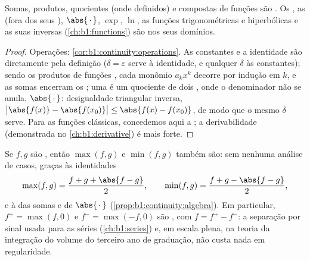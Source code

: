 \begin{proposition}\label{prop:b1:continuity:algebra}
Somas, produtos, quocientes (onde definidos) e compostas de
funções  são . Os , as 
(fora dos seus ), $\abs{\,\cdot\,}$, $\exp$, $\ln$, as
funções trigonométricas e hiperbólicas e as suas inversas
(\cref{ch:b1:functions}) são  nos seus domínios.
\end{proposition}

\begin{proof}
Operações: \cref{cor:b1:continuity:operations}. As constantes e
a identidade são  diretamente pela definição
($\delta = \varepsilon$ serve à identidade, e qualquer $\delta$ às
constantes); sendo  os produtos de funções ,
cada monômio $a_k x^k$ decorre por indução em $k$, e as somas
encerram os ; uma  é um quociente de dois
,  onde o denominador não se
anula. $\abs{\,\cdot\,}$: desigualdade triangular inversa,
$\bigl|\abs{f(x)} - \abs{f(x_0)}\bigr| \leq \abs{f(x) -
f(x_0)}$, de modo que o mesmo $\delta$ serve. Para as funções
clássicas, concedemos aqui a ; a derivabilidade (demonstrada
no \cref{ch:b1:derivative}) é mais forte.
\end{proof}

\begin{example}\label{ex:b1:continuity:maxmin}
Se $f, g$ são , então $\max(f, g)$ e $\min(f, g)$ também são:
sem nenhuma análise de casos, graças às identidades
\[
\max(f, g) = \frac{f + g + \abs{f - g}}{2},
\qquad
\min(f, g) = \frac{f + g - \abs{f - g}}{2},
\]
e à  das somas e de $\abs{\,\cdot\,}$
(\cref{prop:b1:continuity:algebra}). Em particular, $f^+ =
\max(f, 0)$ e $f^- = \max(-f, 0)$ são , com $f =
f^+ - f^-$: a separação por sinal usada para as séries
(\cref{ch:b1:series}) e, em escala plena, na teoria da integração do
volume do terceiro ano de graduação, não custa nada em regularidade.
\end{example}

